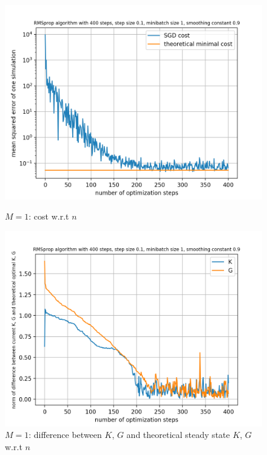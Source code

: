 \documentclass{article}
\begin{document}
\begin{figure}[h!]
	\centering
	\begin{minipage}[t]{.28\paperwidth}
		\centering
		\includegraphics[width=1.0\textwidth]{Figures/M1.png}
		\caption{$M=1$: cost w.r.t $n$ \label{fig:M_1}}
	\end{minipage}%
	\begin{minipage}[t]{.28\paperwidth}
		\centering
		\includegraphics[width=1.0\textwidth]{Figures/d_M1.png}
		\caption{$M=1$: difference between $K$, $G$ and theoretical steady state $K$, $G$ w.r.t $n$}
	\end{minipage}%
	\begin{minipage}[t]{.28\paperwidth}
		\centering

\end{minipage}
\end{figure}
\end{document}
